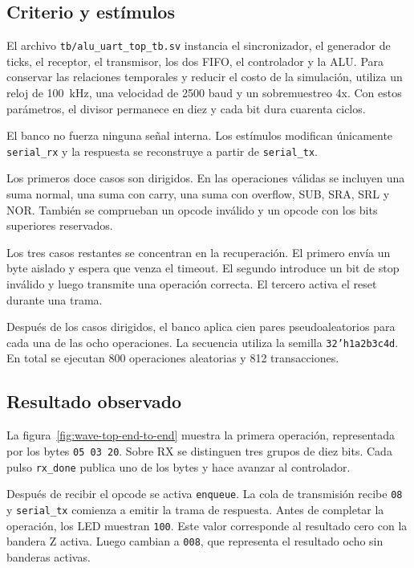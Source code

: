 \subsection{Criterio y estímulos}

El archivo \texttt{tb/alu\_uart\_top\_tb.sv} instancia el
sincronizador, el generador de ticks, el receptor, el transmisor, los
dos FIFO, el controlador y la ALU. Para conservar las relaciones
temporales y reducir el costo de la simulación, utiliza un reloj de
\SI{100}{\kilo\hertz}, una velocidad de \num{2500} baud y un
sobremuestreo 4x. Con estos parámetros, el divisor permanece en diez
y cada bit dura cuarenta ciclos.

El banco no fuerza ninguna señal interna. Los estímulos modifican
únicamente \texttt{serial\_rx} y la respuesta se reconstruye a partir
de \texttt{serial\_tx}.

Los primeros doce casos son dirigidos. En las operaciones válidas se
incluyen una suma normal, una suma con carry, una suma con overflow,
SUB, SRA, SRL y NOR. También se comprueban un opcode inválido y un
opcode con los bits superiores reservados.

Los tres casos restantes se concentran en la recuperación. El primero
envía un byte aislado y espera que venza el timeout. El segundo
introduce un bit de stop inválido y luego transmite una operación
correcta. El tercero activa el reset durante una trama.

Después de los casos dirigidos, el banco aplica cien pares
pseudoaleatorios para cada una de las ocho operaciones. La secuencia
utiliza la semilla \texttt{32'h1a2b3c4d}. En total se ejecutan 800
operaciones aleatorias y 812 transacciones.

\subsection{Resultado observado}

La figura~\ref{fig:wave-top-end-to-end} muestra la primera operación,
representada por los bytes \texttt{05 03 20}. Sobre RX se distinguen
tres grupos de diez bits. Cada pulso \texttt{rx\_done} publica uno de
los bytes y hace avanzar al controlador.

Después de recibir el opcode se activa \texttt{enqueue}. La cola de
transmisión recibe \texttt{08} y \texttt{serial\_tx} comienza a
emitir la trama de respuesta. Antes de completar la operación, los
LED muestran \texttt{100}. Este valor corresponde al resultado cero
con la bandera Z activa. Luego cambian a \texttt{008}, que representa
el resultado ocho sin banderas activas.

